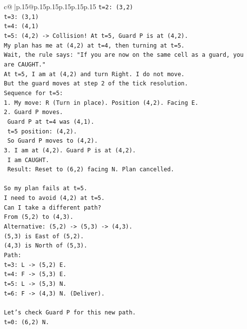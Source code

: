 \documentclass{article}
\begin{document}
{\begin{supertabular}{c@{$\;$}|p{.15\linewidth}@{}p{.15\linewidth}p{.15\linewidth}p{.15\linewidth}p{.15\linewidth}p{.15\linewidth}}
{{{\texttt{t=2: (3,2)} \\
\texttt{t=3: (3,1)} \\
\texttt{t=4: (4,1)} \\
\texttt{t=5: (4,2) {-}> Collision! At t=5, Guard P is at (4,2).} \\
\texttt{My plan has me at (4,2) at t=4, then turning at t=5.} \\
\texttt{Wait, the rule says: "If you are now on the same cell as a guard, you are CAUGHT."} \\
\texttt{At t=5, I am at (4,2) and turn Right. I do not move.} \\
\texttt{But the guard moves at step 2 of the tick resolution.} \\
\texttt{Sequence for t=5:} \\
\texttt{1. My move: R (Turn in place). Position (4,2). Facing E.} \\
\texttt{2. Guard P moves.} \\
\texttt{   Guard P at t=4 was (4,1).} \\
\texttt{   t=5 position: (4,2).} \\
\texttt{   So Guard P moves to (4,2).} \\
\texttt{3. I am at (4,2). Guard P is at (4,2).} \\
\texttt{   I am CAUGHT.} \\
\texttt{   Result: Reset to (6,2) facing N. Plan cancelled.} \\
\\ 
\texttt{So my plan fails at t=5.} \\
\texttt{I need to avoid (4,2) at t=5.} \\
\texttt{Can I take a different path?} \\
\texttt{From (5,2) to (4,3).} \\
\texttt{Alternative: (5,2) {-}> (5,3) {-}> (4,3).} \\
\texttt{(5,3) is East of (5,2).} \\
\texttt{(4,3) is North of (5,3).} \\
\texttt{Path:} \\
\texttt{t=3: L {-}> (5,2) E.} \\
\texttt{t=4: F {-}> (5,3) E.} \\
\texttt{t=5: L {-}> (5,3) N.} \\
\texttt{t=6: F {-}> (4,3) N. (Deliver).} \\
\\ 
\texttt{Let's check Guard P for this new path.} \\
\texttt{t=0: (6,2) N.} \\
}}}
\end{supertabular}}
\end{document}
